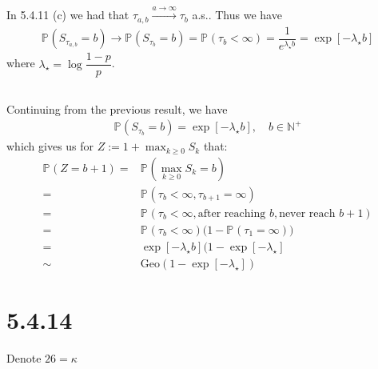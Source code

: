 \documentclass[11pt,a4paper]{ctexart}
\numberwithin{equation}{section}%
\begin{document}
\subsection{}

In 5.4.11 (c) we had that $ \tau_{a,b}\mathop{ \to }\limits^{a\to \infty} \tau_b  $ a.s.. Thus we have
\begin{align*}
    \mathbb{P}_{  }\left(  S_{\tau_{a,b}} = b  \right) \to  \mathbb{P}_{  }\left( S_{\tau_b}=b \right) = \mathbb{P}_{  }\left( \tau_b<\infty \right) = \dfrac{ 1 }{ e^{\lambda _\star b} } = \exp\left[ -\lambda _\star b \right] 
\end{align*}
where $ \lambda _\star = \log\dfrac{ 1-p }{ p } $.

\subsection{}

Continuing from the previous result, we have
\begin{align*}
    \mathbb{P}_{  }\left( S_{\tau_b}=b \right) = \exp\left[ -\lambda _\star b \right] ,\quad b\in \mathbb{N}^+
\end{align*}
which gives us for $ Z:= 1+ \max_{k\geq 0}S_k $ that:
\begin{align*}
    \mathbb{P}_{  }\left( Z=b+1 \right) =&  \mathbb{P}_{  }\left( \max_{k\geq 0}S_k = b \right)\\
    =& \mathbb{P}_{  }\left( \tau_b <\infty, \tau_{b+1}=\infty \right)\\
    =& \mathbb{P}_{  }\left( \tau_b <\infty,  \text{after reaching } b, \text{never reach } b+1 \right)\\
    =& \mathbb{P}_{  }\left( \tau_b < \infty \right)\big(1- \mathbb{P}_{  }\left( \tau_1 = \infty \right) \big)\\
    =& \exp\left[ -\lambda _\star b \right] \big(1- \exp\left[ -\lambda _\star \right]\\
    \sim& \mathrm{ Geo }( 1- \exp\left[ -\lambda _\star \right] )
\end{align*}



\section{5.4.14}

Denote $ 26 = \kappa  $

\subsection{}
\end{document}
